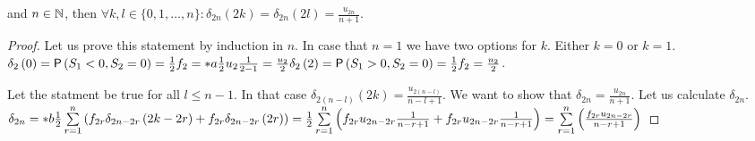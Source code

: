 \begin{thm}
  \Lrws  and $n \in \mathbb{N}$, then $\forall k,l \in \{0,1, \ldots, n \}:\delta_{2n}\left( 2k \right)=\delta_{2n}\left( 2l \right)=\frac{u_{2n}}{n+1}.$
\end{thm}
\begin{proof}
  Let us prove this statement by induction in $n$. In case that $n=1$ we have two options for $k$. Either $k=0$ or $k=1$. $\delta_2\left(0 \right)=\operatorname{\textsf{P}}\left( S_1<0, S_2=0\right)=\frac{1}{2} f_2=*a
  \frac{1}{2} u_2\frac{1}{2-1}=\frac{u_2}{2}
  \delta_2 \left( 2\right)=\operatorname{\textsf{P}} \left( S_1>0, S_2=0\right)=\frac{1}{2} f_2=\frac{u_2}{2}$.

  Let the statment be true for all $l\leq n-1$. In that case $\delta_{2(n-l)}\left( 2k \right)=\frac{u_{2(n-l)}}{n-l+1}$. We want to show that $\delta_{2n}=\frac{u_{2n}}{n+1}$.
  Let us calculate $\delta_{2n}$. $\delta_{2n}=*b
  \h \suma[r][1][n]\left( f_{2r} \delta_{2n-2r}\left(2k-2r\right)+f_{2r} \delta_{2n-2r}\left( 2r \right)\right)=
  \h \suma[r][1][n]\left( f_{2r} u_{2n-2r}\frac{1}{n-r+1}+f_{2r}u_{2n-2r}\frac{1}{n-r+1}\right)=\suma[r][1][n]\left( \frac{f_{2r} u_{2n-2r}}{n-r+1}\right)$
\end{proof}

